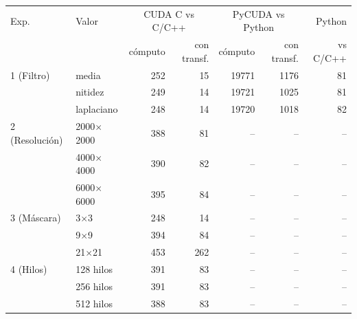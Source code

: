 \begin{tabular}{llrrrrr}
\toprule
Exp. & Valor & \multicolumn{2}{c}{CUDA C vs C/C++} & \multicolumn{2}{c}{PyCUDA vs Python} & Python \\
 & & cómputo & con transf. & cómputo & con transf. & vs C/C++ \\
\midrule
1 (Filtro) & media & 252 & 15 & 19771 & 1176 & 81 \\
 & nitidez & 249 & 14 & 19721 & 1025 & 81 \\
 & laplaciano & 248 & 14 & 19720 & 1018 & 82 \\
\midrule
2 (Resolución) & 2000$\times$2000 & 388 & 81 & -- & -- & -- \\
 & 4000$\times$4000 & 390 & 82 & -- & -- & -- \\
 & 6000$\times$6000 & 395 & 84 & -- & -- & -- \\
\midrule
3 (Máscara) & 3$\times$3 & 248 & 14 & -- & -- & -- \\
 & 9$\times$9 & 394 & 84 & -- & -- & -- \\
 & 21$\times$21 & 453 & 262 & -- & -- & -- \\
\midrule
4 (Hilos) & 128 hilos & 391 & 83 & -- & -- & -- \\
 & 256 hilos & 391 & 83 & -- & -- & -- \\
 & 512 hilos & 388 & 83 & -- & -- & -- \\
\bottomrule
\end{tabular}
